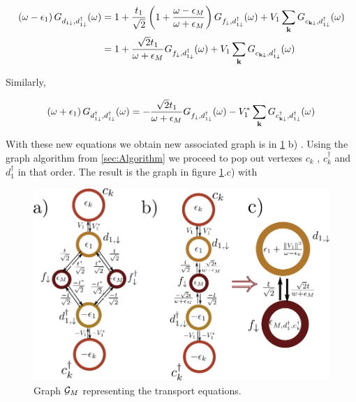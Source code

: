  \begin{align}
\left(\omega-\epsilon_{1}\right)G_{d_{1\downarrow},d_{1\downarrow}^{\dagger}}(\omega)&=1+\frac{t_{1}}{\sqrt{2}}\left(1+\frac{\omega-\epsilon_{M}}{\omega+\epsilon_{M}}\right)G_{f_{\downarrow},d_{1\downarrow}^{\dagger}}(\omega)+V_{1}\sum_{\mathbf{k}}G_{c_{\mathbf{k\downarrow}},d_{1\downarrow}^{\dagger}}(\omega) \\
&=1+\frac{\sqrt{2}t_{1}}{\omega+\epsilon_{M}}G_{f_{\downarrow},d_{1\downarrow}^{\dagger}}(\omega)+V_{1}\sum_{\mathbf{k}}G_{c_{\mathbf{k\downarrow}},d_{1\downarrow}^{\dagger}}(\omega)
\end{align}

Similarly, 

\begin{equation}
    \left(\omega+\epsilon_{1}\right)G_{d_{1\downarrow}^{\dagger},d_{1\downarrow}^{\dagger}}(\omega)=-\frac{\sqrt{2}t_{1}}{\omega+\epsilon_{M}}G_{f_{\downarrow},d_{1\downarrow}^{\dagger}}(\omega)-V_{1}^{*}\sum_{\mathbf{k}}G_{c_{\mathbf{k\downarrow}}^{\dagger},d_{1\downarrow}^{\dagger}}(\omega)
\end{equation} 
 
 
 With these new equations we obtain new associated graph is  in \ref{fig:green-M-QD} b) .  Using the graph algorithm from \ref{sec:Algorithm}  we proceed to pop out vertexes $c_k$ , $c_k^\dagger$ and $d_1^\dagger$ in that order. The result is the graph in figure \ref{fig:green-M-QD}.c) with 
 
 \begin{figure}[t]
    \centering
    \includegraphics[scale=0.5]{IMAGES/Graphs/Grenn-Majorana.png}
    \caption{ \label{fig:green-M-QD} Graph $\mathcal{G}_M$ representing the transport equations.   \protect{}}
\end{figure}
 

